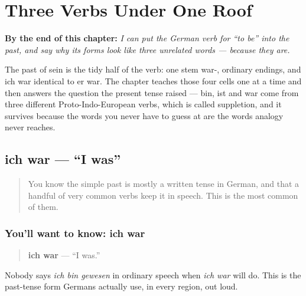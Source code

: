 
\chapter{Three Verbs Under One Roof}
\label{ch:ge-sein-drei-wurzeln}

\begin{chapteropening}
\textbf{By the end of this chapter:} \emph{I can put the German verb for “to be” into the past, and say why its forms look like three unrelated words — because they are.}

The past of sein is the tidy half of the verb: one stem war-, ordinary endings, and ich war identical to er war. The chapter teaches those four cells one at a time and then answers the question the present tense raised — bin, ist and war come from three different Proto-Indo-European verbs, which is called suppletion, and it survives because the words you never have to guess at are the words analogy never reaches.
\end{chapteropening}

\section[ich war]{ich war — \textquotedblleft{}I was\textquotedblright{}}

\label{lesson:GE-C16-ich-war}



\begin{quote}
You know the simple past is mostly a written tense in German, and that a handful of very common verbs keep it in speech. This is the most common of them.
\end{quote}

\subsection*{You'll want to know: ich war}
\begin{quote}
\textbf{ich war} — \textquotedblleft{}I was.\textquotedblright{}
\end{quote}

Nobody says \emph{ich bin gewesen} in ordinary speech when \emph{ich war} will do. This is the past-tense form Germans actually use, in every region, out loud.

